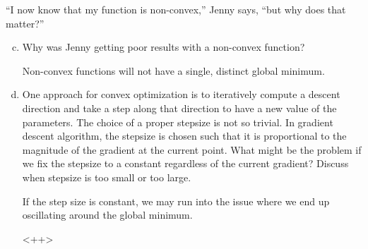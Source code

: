 \documentclass{article}
\begin{document}
``I now know that my function is non-convex,'' Jenny says, ``but why does that matter?''
\begin{enumerate}[(a)]
		\setcounter{enumi}{2}
	\item Why was Jenny getting poor results with a non-convex function?
		\begin{answer*}
			Non-convex functions will not have a single, distinct global minimum.
		\end{answer*}

	\item One approach for convex optimization is to iteratively compute a descent direction and take a step along that direction to have a new value of the parameters. The choice of a proper stepsize is not so trivial. In gradient descent algorithm, the stepsize is chosen such that it is proportional to the magnitude of the gradient at the current point. What might be the problem if we fix the stepsize to a constant regardless of the current gradient? Discuss when stepsize is too small or too large.
		\begin{answer*}
			If the step size is constant, we may run into the issue where we end up oscillating around the global minimum. 
		\end{answer*}<++>

\end{enumerate}
\end{document}
